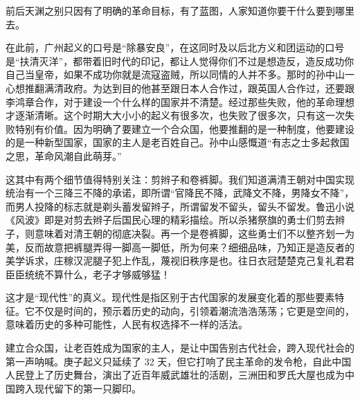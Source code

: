 前后天渊之别只因有了明确的革命目标，有了蓝图，人家知道你要干什么要到哪里去。

在此前，广州起义的口号是“除暴安良”，在这同时及以后北方义和团运动的口号是“扶清灭洋”，都带着旧时代的印记，都让人觉得你们不过是想造反，造反成功你自己当皇帝，如果不成功你就是流寇盗贼，所以同情的人并不多。那时的孙中山一心想推翻满清政府。为达到目的他甚至跟日本人合作过，跟英国人合作过，还要跟李鸿章合作，对于建设一个什么样的国家并不清楚。经过那些失败，他的革命理想才逐渐清晰。这个时期大大小小的起义有很多次，也失败了很多次，只有这一次失败特别有价值。因为明确了要建立一个合众国，他要推翻的是一种制度，他要建设的是一种新型国家，国家的主人是老百姓自己。孙中山感慨道“有志之士多起救国之思，革命风潮自此萌芽。”

这其中有两个细节值得特别关注：剪辫子和卷裤脚。我们知道满清王朝对中国实现统治有一个三降三不降的承诺，即所谓“官降民不降，武降文不降，男降女不降”，而男人投降的标志就是剃头蓄发留辫子，所谓留发不留头，留头不留发。鲁迅小说《风波》即是对剪去辫子后国民心理的精彩描绘。所以杀猪祭旗的勇士们剪去辫子，则意味着对清王朝的彻底决裂。再一个是卷裤脚，这些勇士们不以整齐划一为美，反而故意把裤腿弄得一脚高一脚低，所为何来？细细品味，乃知正是造反者的美学诉求，庄稼汉泥腿子犯上作乱，蔑视旧秩序是也。往日衣冠楚楚克己复礼君君臣臣统统不算什么，老子才够威够猛！

这才是“现代性”的真义。现代性是指区别于古代国家的发展变化着的那些要素特征。它不仅是时间的，预示着历史的动向，引领着潮流浩浩荡荡；它更是空间的，意味着历史的多种可能性，人民有权选择不一样的活法。

建立合众国，让老百姓成为国家的主人，是让中国告别古代社会，跨入现代社会的第一声呐喊。庚子起义只延续了 32 天，但它打响了民主革命的发令枪，自此中国人民登上了历史舞台，演出了近百年威武雄壮的活剧，三洲田和罗氏大屋也成为中国跨入现代留下的第一只脚印。
